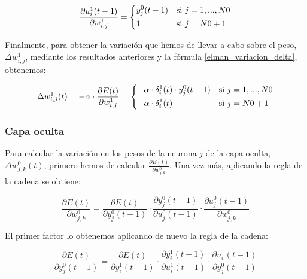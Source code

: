 \documentclass[a4paper,11pt]{article}
\begin{document}
\textbf{\begin{equation}
	\frac{\partial u_{i}^{1}(t-1)}{\partial w_{i,j}^{1}} =
    \begin{dcases}
    	y_{j}^{0}(t-1)	& \textrm{si } j=1,...,N0\\
		1				& \textrm{si } j=N0+1\\
	\end{dcases}
\end{equation}}

Finalmente, para obtener la variación que hemos de llevar a cabo sobre el peso, ${\Delta w_{i,j}^{1}}$, mediante los resultados anteriores y la fórmula \ref{elman_variacion_delta}, obtenemos:

\begin{equation}
	\Delta w_{i,j}^{1}(t) = -\alpha \cdot \frac{\partial E(t)}{\partial w_{i,j}^{1}} =
    \begin{dcases}
    	-\alpha \cdot \delta_{i}^{1}(t) \cdot y_{j}^{0}(t-1)	& \textrm{si } j=1,...,N0\\
		-\alpha \cdot \delta_{i}^{1}(t)							& \textrm{si } j=N0+1\\
	\end{dcases}
\end{equation}

\subsubsection{Capa oculta}
Para calcular la variación en los pesos de la neurona ${j}$ de la capa oculta, ${\Delta w_{j,k}^{0}(t)}$, primero hemos de calcular ${\frac{\partial E(t)}{\partial w_{j,k}^{0}}}$. Una vez más, aplicando la regla de la cadena se obtiene:

\begin{equation}
	\label{elman_oculta_derivada_E}
	\frac{\partial E(t)}{\partial w_{j,k}^{0}} = \frac{\partial E(t)}{\partial y_{j}^{0}(t-1)} \cdot \frac{\partial y_{j}^{0}(t-1)}{\partial u_{j}^{0}(t-1)} \cdot \frac{\partial u_{j}^{0}(t-1)}{\partial w_{j,k}^{0}}
\end{equation}

El primer factor lo obtenemos aplicando de nuevo la regla de la cadena:

\begin{equation}
	\frac{\partial E(t)}{\partial y_{j}^{0}(t-1)} = \frac{\partial E(t)}{\partial y_{i}^{1}(t-1)} \cdot \frac{\partial y_{i}^{1}(t-1)}{\partial u_{i}^{1}(t-1)} \cdot \frac{\partial u_{i}^{1}(t-1)}{\partial y_{j}^{0}(t-1)}
\end{equation}
\end{document}
